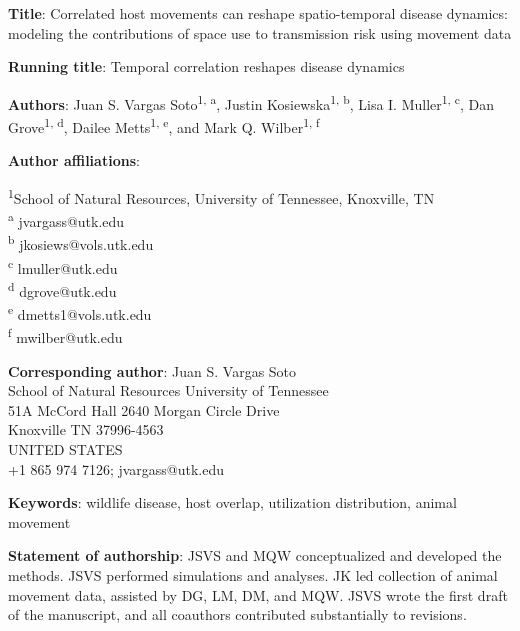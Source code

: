 \documentclass[letterpaper]{article}
\begin{document}
\noindent
\textbf{Title}: Correlated host movements can reshape spatio-temporal disease dynamics: modeling the contributions of space use to transmission risk using movement data

\bigskip

\noindent
\textbf{Running title}: Temporal correlation reshapes disease dynamics

\bigskip

\noindent
\textbf{Authors}: Juan S. Vargas Soto\textsuperscript{1, a}, Justin Kosiewska\textsuperscript{1, b}, Lisa I. Muller\textsuperscript{1, c}, Dan Grove\textsuperscript{1, d}, Dailee Metts\textsuperscript{1, e}, and Mark Q. Wilber\textsuperscript{1, f}

\bigskip

\noindent
\textbf{Author affiliations}:

\noindent
\textsuperscript{1}School of Natural Resources, University of Tennessee, Knoxville, TN \\
\textsuperscript{a} jvargass@utk.edu\\
\textsuperscript{b} jkosiews@vols.utk.edu\\
\textsuperscript{c} lmuller@utk.edu\\
\textsuperscript{d} dgrove@utk.edu\\
\textsuperscript{e} dmetts1@vols.utk.edu\\
\textsuperscript{f} mwilber@utk.edu

\bigskip

\noindent
\textbf{Corresponding author}: Juan S. Vargas Soto\\
School of Natural Resources University of Tennessee\\
51A McCord Hall 2640 Morgan Circle Drive\\
Knoxville TN 37996-4563\\
UNITED STATES\\
+1 865 974 7126; jvargass@utk.edu

\bigskip

\noindent
\textbf{Keywords}: wildlife disease, host overlap, utilization distribution, animal movement

\bigskip

\noindent

\bigskip
\noindent
\textbf{Statement of authorship}: JSVS and MQW conceptualized and developed the methods. JSVS performed simulations and analyses. JK led collection of animal movement data, assisted by DG, LM, DM, and MQW. JSVS wrote the first draft of the manuscript, and all coauthors contributed substantially to revisions. 
\end{document}
